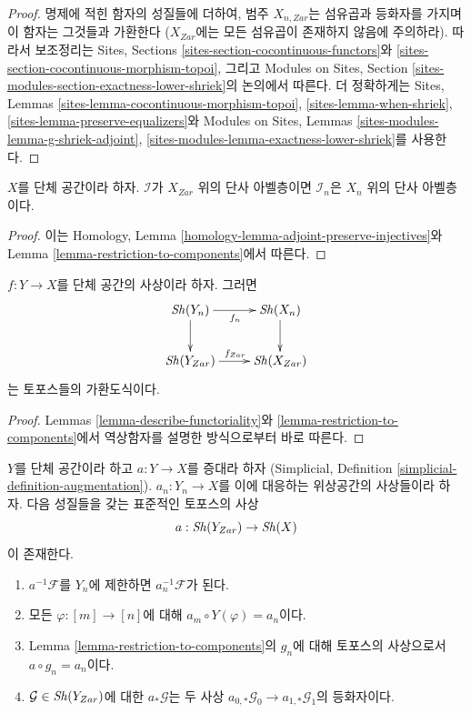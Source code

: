 \begin{proof}
명제에 적힌 함자의 성질들에 더하여, 범주 $X_{n, Zar}$는
섬유곱과 등화자를 가지며 이 함자는 그것들과 가환한다
($X_{Zar}$에는 모든 섬유곱이 존재하지 않음에 주의하라).
따라서 보조정리는 Sites, Sections
\ref{sites-section-cocontinuous-functors}와
\ref{sites-section-cocontinuous-morphism-topoi},
그리고 Modules on Sites, Section
\ref{sites-modules-section-exactness-lower-shriek}의 논의에서 따른다.
더 정확하게는 Sites, Lemmas
\ref{sites-lemma-cocontinuous-morphism-topoi},
\ref{sites-lemma-when-shriek},
\ref{sites-lemma-preserve-equalizers}와 Modules on Sites, Lemmas
\ref{sites-modules-lemma-g-shriek-adjoint},
\ref{sites-modules-lemma-exactness-lower-shriek}를 사용한다.
\end{proof}

\begin{lemma}
\label{lemma-restriction-injective-to-component}
$X$를 단체 공간이라 하자. $\mathcal{I}$가 $X_{Zar}$ 위의
단사 아벨층이면 $\mathcal{I}_n$은 $X_n$ 위의 단사 아벨층이다.
\end{lemma}

\begin{proof}
이는 Homology, Lemma \ref{homology-lemma-adjoint-preserve-injectives}와
Lemma \ref{lemma-restriction-to-components}에서 따른다.
\end{proof}

\begin{lemma}
\label{lemma-restriction-to-components-functorial}
$f : Y \to X$를 단체 공간의 사상이라 하자. 그러면
$$
\xymatrix{
\Sh(Y_n) \ar[d] \ar[r]_{f_n} & \Sh(X_n) \ar[d] \\
\Sh(Y_{Zar}) \ar[r]^{f_{Zar}} & \Sh(X_{Zar})
}
$$
는 토포스들의 가환도식이다.
\end{lemma}

\begin{proof}
Lemmas \ref{lemma-describe-functoriality}와
\ref{lemma-restriction-to-components}에서 역상함자를 설명한 방식으로부터
바로 따른다.
\end{proof}

\begin{lemma}
\label{lemma-augmentation}
$Y$를 단체 공간이라 하고 $a : Y \to X$를 증대라 하자
(Simplicial, Definition \ref{simplicial-definition-augmentation}).
$a_n : Y_n \to X$를 이에 대응하는 위상공간의 사상들이라 하자.
다음 성질들을 갖는 표준적인 토포스의 사상
$$
a : \mathop{\mathit{Sh}}\nolimits(Y_{Zar}) \to \mathop{\mathit{Sh}}\nolimits(X)
$$
이 존재한다.
\begin{enumerate}
\item $a^{-1}\mathcal{F}$를 $Y_n$에 제한하면
$a_n^{-1}\mathcal{F}$가 된다.
\item 모든 $\varphi : [m] \to [n]$에 대해
$a_m \circ Y(\varphi) = a_n$이다.
\item Lemma \ref{lemma-restriction-to-components}의 $g_n$에 대해
토포스의 사상으로서 $a \circ g_n = a_n$이다.
\item $\mathcal{G} \in \mathop{\mathit{Sh}}\nolimits(Y_{Zar})$에 대한 $a_*\mathcal{G}$는
두 사상 $a_{0, *}\mathcal{G}_0 \to a_{1, *}\mathcal{G}_1$의 등화자이다.
\end{enumerate}
\end{lemma}

